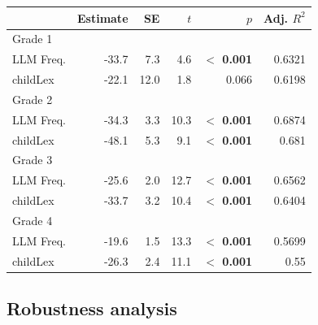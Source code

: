 \documentclass[manuscript]{stjour}
\begin{document}
\begin{table}[!htbp]
\centering
\begin{tabular}{lrrrrr}
  \hline
 & Estimate & SE & $t$ & $p$ & Adj. $R^2$   \\ 
  \hline
  Grade 1 \\ 
  LLM Freq. & -33.7 & 7.3 & 4.6 & \textbf{$<$ 0.001} & 0.6321 \\ 
  childLex & -22.1 & 12.0 & 1.8 & 0.066 & 0.6198\\ 
  Grade 2 \\ 
  LLM Freq. & -34.3 & 3.3 & 10.3 & \textbf{$<$ 0.001} & 0.6874 \\ 
  childLex & -48.1 & 5.3 & 9.1 & \textbf{$<$ 0.001} & 0.681 \\ 
    Grade 3 \\ 
  LLM Freq. & -25.6 & 2.0 & 12.7 & \textbf{$<$ 0.001} & 0.6562 \\ 
  childLex & -33.7 & 3.2 & 10.4 & \textbf{$<$ 0.001} & 0.6404 \\ 
      Grade 4 \\ 
  LLM Freq. & -19.6 & 1.5 & 13.3 & \textbf{$<$ 0.001} & 0.5699 \\ 
  childLex & -26.3 & 2.4 & 11.1 & \textbf{$<$ 0.001} & 0.55 \\ 
  \hline
\end{tabular}
\end{table}

\clearpage




\subsection{Robustness analysis}\label{sec:rob}
\end{document}
